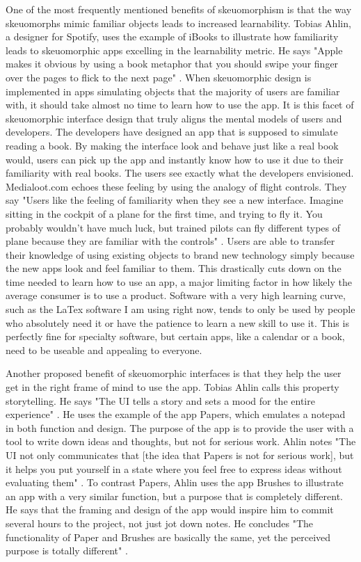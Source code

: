 \documentclass{article}
\begin{document}
	One of the most frequently mentioned benefits of skeuomorphism is that the way skeuomorphs mimic familiar objects leads to increased learnability. Tobias Ahlin, a designer for Spotify, uses the example of iBooks to illustrate how familiarity leads to skeuomorphic apps excelling in the learnability metric. He says "Apple makes it obvious by using a book metaphor that you should swipe your finger over the pages to flick to the next page" \cite{story}. When skeuomorphic design is implemented in apps simulating objects that the majority of users are familiar with, it should take almost no time to learn how to use the app. It is this facet of skeuomorphic interface design that truly aligns the mental models of users and developers. The developers have designed an app that is supposed to simulate reading a book. By making the interface look and behave just like a real book would, users can pick up the app and instantly know how to use it due to their familiarity with real books. The users see exactly what the developers envisioned. Medialoot.com echoes these feeling by using the analogy of flight controls. They say "Users like the feeling of familiarity when they see a new interface. Imagine sitting in the cockpit of a plane for the first time, and trying to fly it. You probably wouldn't have much luck, but trained pilots can fly different types of plane because they are familiar with the controls" \cite{medialoot}. Users are able to transfer their knowledge of using existing objects to brand new technology simply because the new apps look and feel familiar to them. This drastically cuts down on the time needed to learn how to use an app, a major limiting factor in how likely the average consumer is to use a product. Software with a very high learning curve, such as the LaTex software I am using right now, tends to only be used by people who absolutely need it or have the patience to learn a new skill to use it. This is perfectly fine for specialty software, but certain apps, like a calendar or a book, need to be useable and appealing to everyone.
	
	Another proposed benefit of skeuomorphic interfaces is that they help the user get in the right frame of mind to use the app. Tobias Ahlin calls this property storytelling. He says "The UI tells a story and sets a mood for the entire experience" \cite{story}. He uses the example of the app Papers, which emulates a notepad in both function and design.  The purpose of the app is to provide the user with a tool to write down ideas and thoughts, but not for serious work. Ahlin notes "The UI not only communicates that [the idea that Papers is not for serious work], but it helps you put yourself in a state where you feel free to express ideas without evaluating them" \cite{story}. To contrast Papers, Ahlin uses the app Brushes to illustrate an app with a very similar function, but a purpose that is completely different. He says that the framing and design of the app would inspire him to commit several hours to the project, not just jot down notes. He concludes "The functionality of Paper and Brushes are basically the same, yet the perceived purpose is totally different" \cite{story}.
	
\end{document}
